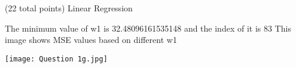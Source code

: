 \documentclass[12pt]{article}
\begin{document}
\begin{question}{(22 total points) Linear Regression}
\begin{subquestion}
\begin{answerbox}{35em}
The minimum value of w1 is 32.48096161535148 and the index of it is 83
This image shows MSE values based on different w1
\begin{center}
\texttt{[image: Question 1g.jpg]}
\end{center}
\end{answerbox}



\end{subquestion}


 
\end{question}





\clearpage
\end{document}
